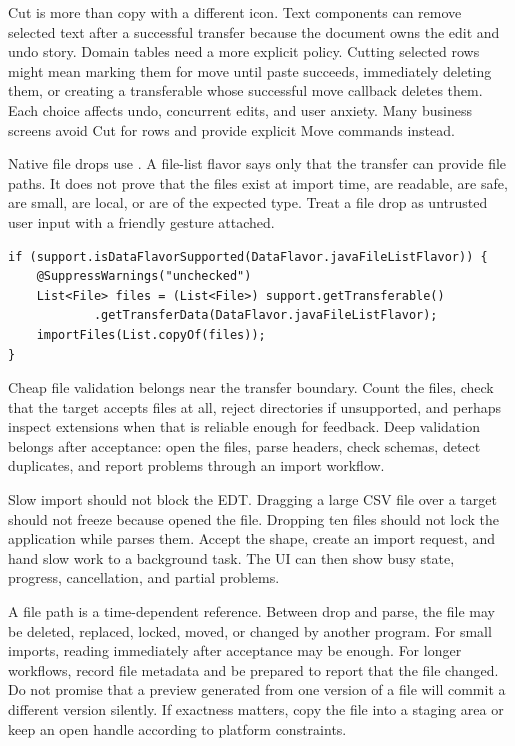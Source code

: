 Cut is more than copy with a different icon. Text components can remove selected text after a successful transfer because the document owns the edit and undo story. Domain tables need a more explicit policy. Cutting selected rows might mean marking them for move until paste succeeds, immediately deleting them, or creating a transferable whose successful move callback deletes them. Each choice affects undo, concurrent edits, and user anxiety. Many business screens avoid Cut for rows and provide explicit Move commands instead.

Native file drops use . A file-list flavor says only that the transfer can provide file paths. It does not prove that the files exist at import time, are readable, are safe, are small, are local, or are of the expected type. Treat a file drop as untrusted user input with a friendly gesture attached.

\begin{lstlisting}[caption={Recognizing a native file-list drop.}]
if (support.isDataFlavorSupported(DataFlavor.javaFileListFlavor)) {
    @SuppressWarnings("unchecked")
    List<File> files = (List<File>) support.getTransferable()
            .getTransferData(DataFlavor.javaFileListFlavor);
    importFiles(List.copyOf(files));
}
\end{lstlisting}

Cheap file validation belongs near the transfer boundary. Count the files, check that the target accepts files at all, reject directories if unsupported, and perhaps inspect extensions when that is reliable enough for feedback. Deep validation belongs after acceptance: open the files, parse headers, check schemas, detect duplicates, and report problems through an import workflow.

Slow import should not block the EDT. Dragging a large CSV file over a target should not freeze because  opened the file. Dropping ten files should not lock the application while  parses them. Accept the shape, create an import request, and hand slow work to a background task. The UI can then show busy state, progress, cancellation, and partial problems.

A file path is a time-dependent reference. Between drop and parse, the file may be deleted, replaced, locked, moved, or changed by another program. For small imports, reading immediately after acceptance may be enough. For longer workflows, record file metadata and be prepared to report that the file changed. Do not promise that a preview generated from one version of a file will commit a different version silently. If exactness matters, copy the file into a staging area or keep an open handle according to platform constraints.


